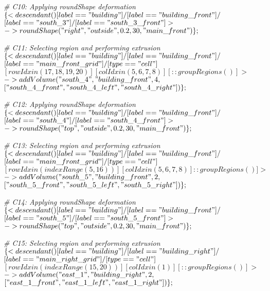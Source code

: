 \noindent \textit{\# C10: Applying roundShape deformation}\\
$\{< descendant() [label=="building"] / [label=="building\_front"] / $\\
$[label=="south\_3"] / [label=="south\_3\_front"] > $\\
$-> roundShape("right", "outside", 0.2, 30, "main\_front")\};$

\noindent \textit{\# C11: Selecting region and performing extrusion}\\
$\{< descendant() [label=="building"] / [label=="building\_front"] / $\\
$[label=="main\_front\_grid"] / [type=="cell"] $\\
$[rowIdx in (17, 18, 19, 20)] [colIdx in (5, 6, 7, 8)] [::groupRegions()] > $\\
$-> addVolume("south\_4", "building\_front", 4, $\\
$["south\_4\_front", "south\_4\_left", "south\_4\_right"])\};$

\noindent \textit{\# C12: Applying roundShape deformation}\\
$\{< descendant() [label=="building"] / [label=="building\_front"] / $\\
$[label=="south\_4"] / [label=="south\_4\_front"] > $\\
$-> roundShape("top", "outside", 0.2, 30, "main\_front")\};$

\noindent \textit{\# C13: Selecting region and performing extrusion}\\
$\{< descendant() [label=="building"] / [label=="building\_front"] / $\\
$[label=="main\_front\_grid"] / [type=="cell"] $\\
$[rowIdx in (indexRange(5, 16))] [colIdx in (5, 6, 7, 8)] ::groupRegions()] > $\\
$-> addVolume("south\_5", "building\_front", 2, $\\
$["south\_5\_front", "south\_5\_left", "south\_5\_right"])\};$

\noindent \textit{\# C14: Applying roundShape deformation}\\
$\{< descendant() [label=="building"] / [label=="building\_front"] / $\\
$[label=="south\_5"] / [label=="south\_5\_front"] > $\\
$-> roundShape("top", "outside", 0.2, 30, "main\_front")\};$

\noindent \textit{\# C15: Selecting region and performing extrusion}\\
$\{< descendant() [label=="building"] / [label=="building\_right"] / $\\
$[label=="main\_right\_grid"] / [type=="cell"] $\\
$[rowIdx in (indexRange(15, 20))] [colIdx in (1)] [::groupRegions()] > $\\
$-> addVolume("east\_1", "building\_right", 2, $\\
$["east\_1\_front", "east\_1\_left", "east\_1\_right"])\};$

